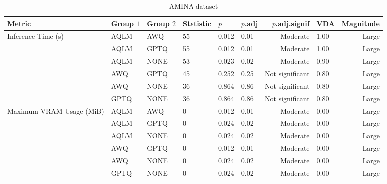 \begin{table}[H]
\centering
\caption*{AMINA dataset}
\begin{tabular}{llllllrlr}
\toprule
Metric & Group $1$ & Group $2$ & Statistic & $p$ & $p$.adj & $p$.adj.signif & VDA & Magnitude\\
\midrule
Inference Time (s) & AQLM & AWQ & 55 & 0.012 & 0.01 & Moderate & 1.00 & Large \\
\phantom & AQLM & GPTQ & 55 & 0.012 & 0.01 & Moderate & 1.00 & Large \\
\phantom & AQLM & NONE & 53 & 0.023 & 0.02 & Moderate & 0.90 & Large \\
\phantom & AWQ & GPTQ & 45 & 0.252 & 0.25 & Not significant & 0.80 & Large \\
\phantom & AWQ & NONE & 36 & 0.864 & 0.86 & Not significant & 0.80 & Large \\
\phantom & GPTQ & NONE & 36 & 0.864 & 0.86 & Not significant & 0.80 & Large \\
\midrule
Maximum VRAM Usage (MiB) & AQLM & AWQ & 0 & 0.012 & 0.01 & Moderate & 0.00 & Large \\
\phantom & AQLM & GPTQ & 0 & 0.024 & 0.02 & Moderate & 0.00 & Large \\
\phantom & AQLM & NONE & 0 & 0.024 & 0.02 & Moderate & 0.00 & Large \\
\phantom & AWQ & GPTQ & 0 & 0.012 & 0.01 & Moderate & 0.00 & Large \\
\phantom & AWQ & NONE & 0 & 0.024 & 0.02 & Moderate & 0.00 & Large \\
\phantom & GPTQ & NONE & 0 & 0.024 & 0.02 & Moderate & 0.00 & Large \\
\bottomrule
\end{tabular}
\label{tab:RQ2_posthoc_full}
\end{table}
